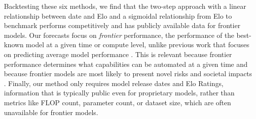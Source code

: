 Backtesting these six methods, we find that the two-step approach with a linear relationship between date and Elo and a sigmoidal relationship from Elo to benchmark performs competitively and has publicly available data for frontier models. 
Our forecasts focus on \emph{frontier} performance, the performance of the best-known model at a given time or compute level, unlike previous work that focuses on predicting average model performance \citep{ruan2024observational, polo2024sloth}. This is relevant because frontier performance determines what capabilities can be automated at a given time and because frontier models are most likely to present novel risks and societal impacts \citep{hendrycks2023overviewcatastrophicairisks}. Finally, our method only requires model release dates and Elo Ratings, information that is typically public even for proprietary models, rather than metrics like FLOP count, parameter count, or dataset size, which are often unavailable for frontier models.



